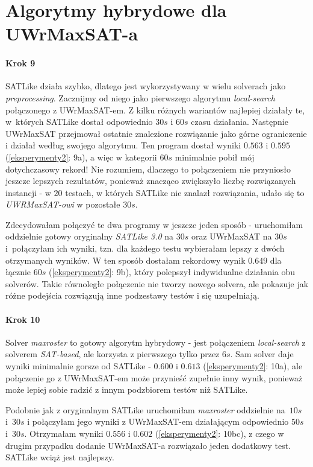 \documentclass[shortabstract]{iithesis}
\begin{document}
\section{Algorytmy hybrydowe dla UWrMaxSAT-a}
\paragraph{Krok 9}
SATLike działa szybko, dlatego jest wykorzystywany w wielu solverach jako \textit{preprocessing}. Zacznijmy od niego jako pierwszego algorytmu \textit{local-search} połączonego z UWrMaxSAT-em. Z kilku różnych wariantów najlepiej działały te, w~których SATLike dostał odpowiednio $30s$ i $60s$ czasu działania. Następnie UWrMaxSAT przejmował ostatnie znalezione rozwiązanie jako górne ograniczenie i działał według swojego algorytmu. Ten program dostał wyniki $0.563$ i $0.595$ (\ref{eksperymenty2}: 9a), a więc w kategorii $60s$ minimalnie pobił mój dotychczasowy rekord! Nie rozumiem, dlaczego to połączeniem nie przyniosło jeszcze lepszych rezultatów, ponieważ znacząco zwiększyło liczbę rozwiązanych instancji - w $20$ testach, w których SATLike nie znalazł rozwiązania, udało się to \textit{UWRMaxSAT-owi} w pozostałe $30s$.

Zdecydowałam połączyć te dwa programy w jeszcze jeden sposób - uruchomiłam oddzielnie gotowy oryginalny \textit{SATLike 3.0} na $30s$ oraz UWrMaxSAT na $30s$ i~połączyłam ich wyniki, tzn. dla każdego testu wybierałam lepszy z dwóch otrzymanych wyników. W ten sposób dostałam rekordowy wynik $0.649$ dla łącznie $60s$ (\ref{eksperymenty2}: 9b), który polepszył indywidualne działania obu solverów. Takie równoległe połączenie nie tworzy nowego solvera, ale pokazuje jak różne podejścia rozwiązują inne podzestawy testów i się uzupełniają.

\paragraph{Krok 10} Solver \textit{maxroster} to gotowy algorytm hybrydowy - jest połączeniem \textit{local-search} z solverem \textit{SAT-based}, ale korzysta z pierwszego tylko przez $6s$. Sam solver daje wyniki minimalnie gorsze od SATLike - $0.600$ i $0.613$ (\ref{eksperymenty2}: 10a), ale połączenie go z UWrMaxSAT-em może przynieść zupełnie inny wynik, ponieważ może lepiej sobie radzić z innym podzbiorem testów niż SATLike.

Podobnie jak z oryginalnym SATLike uruchomiłam \textit{maxroster} oddzielnie na~$10s$ i~$30s$ i połączyłam jego wyniki z UWrMaxSAT-em działającym odpowiednio $50s$ i~$30s$. Otrzymałam wyniki $0.556$ i $0.602$ (\ref{eksperymenty2}: 10bc), z czego w drugim przypadku dodanie UWrMaxSAT-a rozwiązało jeden dodatkowy test. SATLike wciąż jest najlepszy.
\end{document}
